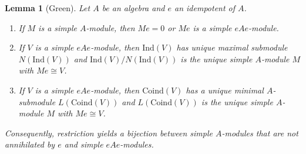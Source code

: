 \documentclass[reqno,11pt]{amsart}
\def\Lemmaname{Lemma}
\newtheorem{Lemma}[Thm]{\Lemmaname}
\numberwithin{equation}{section}
\begin{document}
\begin{Lemma}[Green]\label{greenslemma}
Let $A$ be an algebra and $e$ an idempotent of $A$.
\begin{enumerate}
\item If $M$ is a simple $A$-module, then $Me=0$ or $Me$ is a simple
  $eAe$-module.
\item  If $V$ is a simple $eAe$-module, then
  $\mathrm{Ind}(V)$ has unique maximal
  submodule  $N(\mathrm{Ind}(V))$ and
  $\mathrm{Ind}(V)/N(\mathrm{Ind}(V))$ is the unique simple
$A$-module $M$ with $Me\cong V$.
\item  If $V$ is a simple $eAe$-module, then $\mathrm{Coind}(V)$ has a unique minimal $A$-submodule $L(\mathrm{Coind}(V))$ and $L(\mathrm{Coind}(V))$ is the unique simple $A$-module $M$ with $Me\cong V$.
\end{enumerate}
Consequently, restriction yields a bijection between simple
  $A$-modules that are not annihilated by $e$ and simple
  $eAe$-modules.
\end{Lemma}
\end{document}
